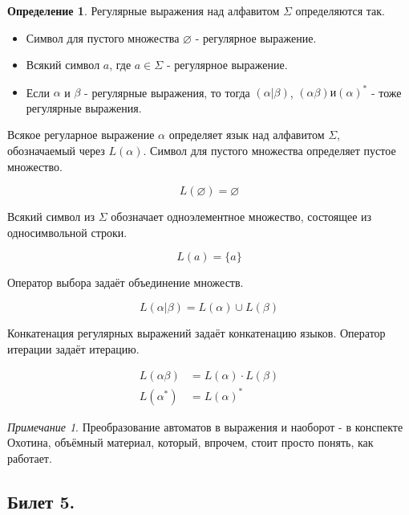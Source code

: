 \documentclass[a4paper]{article}
\theoremstyle{indented}
\theoremstyle{definition}
\newtheorem{defn}{Определение}
\theoremstyle{remark}
\newtheorem{remark}{Примечание}
\begin{document}
\begin{defn}
    Регулярные выражения над алфавитом $\Sigma$ определяются так.

    \begin{itemize}
        \item Символ для пустого множества $\varnothing$ - регулярное выражение.
        \item Всякий символ $a$, где $a \in \Sigma$ - регулярное выражение.
        \item Если $\alpha$ и $\beta$ - регулярные выражения, то тогда $(\alpha | \beta)$, $(\alpha\beta) и (\alpha)^*$ - тоже регулярные выражения.
    \end{itemize}

    Всякое регуларное выражение $\alpha$ определяет язык над алфавитом $\Sigma$, обозначаемый через $L(\alpha)$. Символ для пустого множества определяет пустое множество.

    \[
        L(\varnothing) = \varnothing
    \]

    Всякий символ из $\Sigma$ обозначает одноэлементное множество, состоящее из односимвольной строки.

    \[
        L(a) = \{a\}     
    \]   
        
    Оператор выбора задаёт объединение множеств.

    \[
        L(\alpha | \beta)=L(\alpha)\cup L(\beta)
    \]

    Конкатенация регулярных выражений задаёт конкатенацию языков. Оператор итерации задаёт итерацию.

    \begin{equation*}
        \begin{aligned}
            L(\alpha\beta) &= L(\alpha) \cdot L(\beta) \\ 
            L(\alpha^*) &= L(\alpha)^*
        \end{aligned}
    \end{equation*}
\end{defn}

\begin{remark}
    Преобразование автоматов в выражения и наоборот - в конспекте Охотина, объёмный материал, который, впрочем, стоит просто понять, как работает.
\end{remark}



\newpage 

\subsection{Билет 5.}
\end{document}
